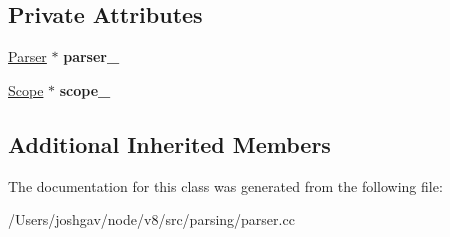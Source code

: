 \subsection*{Private Attributes}
\begin{DoxyCompactItemize}
\item 
\hyperlink{classv8_1_1internal_1_1_parser}{Parser} $\ast$ {\bfseries parser\+\_\+}\hypertarget{classv8_1_1internal_1_1_initializer_rewriter_aa6600264a3a457cc43cfb4235c45de09}{}\label{classv8_1_1internal_1_1_initializer_rewriter_aa6600264a3a457cc43cfb4235c45de09}

\item 
\hyperlink{classv8_1_1internal_1_1_scope}{Scope} $\ast$ {\bfseries scope\+\_\+}\hypertarget{classv8_1_1internal_1_1_initializer_rewriter_a0813ceb9b5379f3aecd64306224be013}{}\label{classv8_1_1internal_1_1_initializer_rewriter_a0813ceb9b5379f3aecd64306224be013}

\end{DoxyCompactItemize}
\subsection*{Additional Inherited Members}


The documentation for this class was generated from the following file\+:\begin{DoxyCompactItemize}
\item 
/\+Users/joshgav/node/v8/src/parsing/parser.\+cc\end{DoxyCompactItemize}
